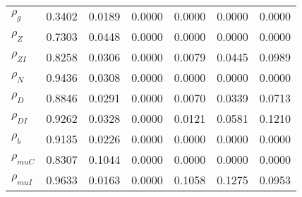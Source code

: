 \begin{center}
\begin{longtable}{lcccccc}
$ {\rho_g}             $	 & 	          0.3402	 & 	          0.0189	 & 	          0.0000	 & 	          0.0000	 & 	          0.0000	 & 	          0.0000 \\ 
$ {\rho_Z}             $	 & 	          0.7303	 & 	          0.0448	 & 	          0.0000	 & 	          0.0000	 & 	          0.0000	 & 	          0.0000 \\ 
$ {\rho_{ZI}}          $	 & 	          0.8258	 & 	          0.0306	 & 	          0.0000	 & 	          0.0079	 & 	          0.0445	 & 	          0.0989 \\ 
$ {\rho_N}             $	 & 	          0.9436	 & 	          0.0308	 & 	          0.0000	 & 	          0.0000	 & 	          0.0000	 & 	          0.0000 \\ 
$ {\rho_D}             $	 & 	          0.8846	 & 	          0.0291	 & 	          0.0000	 & 	          0.0070	 & 	          0.0339	 & 	          0.0713 \\ 
$ {\rho_{DI}}          $	 & 	          0.9262	 & 	          0.0328	 & 	          0.0000	 & 	          0.0121	 & 	          0.0581	 & 	          0.1210 \\ 
$ {\rho_b}             $	 & 	          0.9135	 & 	          0.0226	 & 	          0.0000	 & 	          0.0000	 & 	          0.0000	 & 	          0.0000 \\ 
$ {\rho_{muC}}         $	 & 	          0.8307	 & 	          0.1044	 & 	          0.0000	 & 	          0.0000	 & 	          0.0000	 & 	          0.0000 \\ 
$ {\rho_{muI}}         $	 & 	          0.9633	 & 	          0.0163	 & 	          0.0000	 & 	          0.1058	 & 	          0.1275	 & 	          0.0953 \\ 
\end{longtable}
 \end{center}
